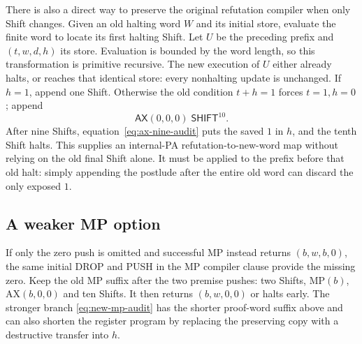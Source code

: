 There is also a direct way to preserve the original refutation compiler
when only Shift changes. Given an old halting word $W$ and its initial
store, evaluate the finite word to locate its first halting Shift. Let
$U$ be the preceding prefix and $(t,w,d,h)$ its store. Evaluation is
bounded by the word length, so this transformation is primitive recursive.
The new execution of $U$ either already halts, or reaches that identical
store: every nonhalting update is unchanged. If $h=1$, append one Shift.
Otherwise the old condition $t+h=1$ forces $t=1,h=0$; append
\[
 \mathsf{AX}(0,0,0)\;\mathsf{SHIFT}^{10}.
\]
After nine Shifts, equation~\eqref{eq:ax-nine-audit} puts the saved $1$
in $h$, and the tenth Shift halts. This supplies an internal-PA
refutation-to-new-word map without relying on the old final Shift alone.
It must be applied to the prefix before that old halt: simply appending
the postlude after the entire old word can discard the only exposed $1$.

\subsection{A weaker MP option}

If only the zero push is omitted and successful MP instead returns
$(b,w,b,0)$, the same initial DROP and PUSH in the MP compiler clause
provide the missing zero. Keep the old MP suffix after the two premise
pushes: two Shifts, MP$(b)$, AX$(b,0,0)$ and ten Shifts. It then returns
$(b,w,0,0)$ or halts early. The stronger branch
\eqref{eq:new-mp-audit} has the shorter proof-word suffix above and can
also shorten the register program by replacing the preserving copy with
a destructive transfer into $h$.
